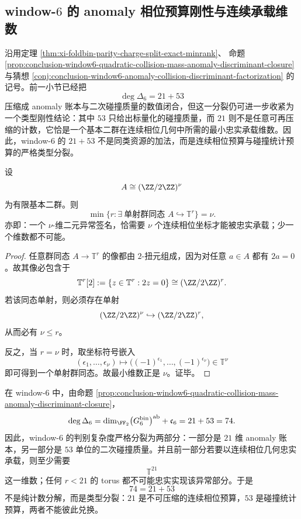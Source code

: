 \subsection{window-\texorpdfstring{$6$}{6} 的 anomaly 相位预算刚性与连续承载维数}\label{subsec:conclusion-window6-phase-budget-rigidity}

沿用定理 \ref{thm:xi-foldbin-parity-charge-split-exact-minrank}、
命题 \ref{prop:conclusion-window6-quadratic-collision-mass-anomaly-discriminant-closure}
与猜想 \ref{conj:conclusion-window6-anomaly-collision-discriminant-factorization} 的记号。前一小节已经把
\[
\deg\Delta_6=21+53
\]
压缩成 anomaly 账本与二次碰撞质量的数值闭合，但这一分裂仍可进一步收紧为一个类型刚性结论：其中 \(53\) 只给出标量化的碰撞质量，而 \(21\) 则不是任意可再压缩的计数，它恰是一个基本二群在连续相位几何中所需的最小忠实承载维数。因此，window-\(6\) 的 \(21+53\) 不是同类资源的加法，而是连续相位预算与碰撞统计预算的严格类型分裂。

\begin{theorem}[基本二群异常签名的最小连续相位承载维数]\label{thm:conclusion-elementary-2group-minimal-torus-dimension}
设
\[
A\cong (\ZZ/2\ZZ)^\nu
\]
为有限基本二群。则
\[
\min\bigl\{r:\exists\ \text{单射群同态 }A\hookrightarrow \mathbb T^r\bigr\}=\nu.
\]
亦即：一个 \(\nu\)-维二元异常签名，恰需要 \(\nu\) 个连续相位坐标才能被忠实承载；少一个维数都不可能。
\end{theorem}

\begin{proof}
任意群同态 \(A\to \mathbb T^r\) 的像都由 \(2\)-扭元组成，因为对任意 \(a\in A\) 都有 \(2a=0\)。故其像必包含于
\[
\mathbb T^r[2]:=\{z\in \mathbb T^r:2z=0\}\cong (\ZZ/2\ZZ)^r.
\]
若该同态单射，则必须存在单射
\[
(\ZZ/2\ZZ)^\nu\hookrightarrow (\ZZ/2\ZZ)^r,
\]
从而必有 \(\nu\le r\)。

反之，当 \(r=\nu\) 时，取坐标符号嵌入
\[
(\epsilon_1,\dots,\epsilon_\nu)\longmapsto
\bigl((-1)^{\epsilon_1},\dots,(-1)^{\epsilon_\nu}\bigr)\in \mathbb T^\nu
\]
即可得到一个单射群同态。故最小维数正是 \(\nu\)。证毕。
\end{proof}

\begin{corollary}\label{cor:conclusion-window6-anomaly-phase-budget-rigidity}
在 window-\(6\) 中，由命题 \ref{prop:conclusion-window6-quadratic-collision-mass-anomaly-discriminant-closure}，
\[
\deg\Delta_6
=
\dim_{\FF_2}\bigl(G_6^{\mathrm{bin}}\bigr)^{\mathrm{ab}}
+\mathfrak c_6
=
21+53
=
74.
\]
因此，window-\(6\) 的判别复杂度严格分裂为两部分：一部分是 \(21\) 维 anomaly 账本，另一部分是 \(53\) 单位的二次碰撞质量。并且前一部分若要以连续相位几何忠实承载，则至少需要
\[
\mathbb T^{21}
\]
这一维数；任何 \(r<21\) 的 torus 都不可能忠实实现该异常部分。于是
\[
74=21+53
\]
不是纯计数分解，而是类型分裂：\(21\) 是不可压缩的连续相位预算，\(53\) 是碰撞统计预算，两者不能彼此兑换。
\end{corollary}


